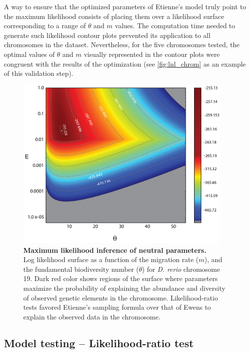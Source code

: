 A way to ensure that the optimized parameters of Etienne's model truly point to the maximum likelihood consists of placing them over a likelihood surface corresponding to a range of  $\theta$ and $m$ values. The computation time needed to generate such likelihood contour plots prevented its application to all chromosomes in the dataset. Nevertheless, for the five chromosomes tested, the optimal values of $\theta$ and $m$ visually represented in the contour plots were congruent with the results of the optimization (see \autoref{fig:lnl_chrom} as an example of this validation step).

\begin{figure}[!ht]
\centering 
\includegraphics[width=0.95\textwidth]{figures/material_methods/lnl_chrom.png}
\caption[Maximum likelihood inference of neutral parameters]{
  {\bf Maximum likelihood inference of neutral parameters.}\\
  Log likelihood surface as a function of the migration rate ($m$), and the fundamental biodiversity number ($\theta$) for \textit{D. rerio} chromosome 19. Dark red color shows regions of the surface where parameters maximize the probability of explaining the abundance and diversity of observed genetic elements in the chromosome. Likelihood-ratio tests favored Etienne's sampling formula over that of Ewens to explain the observed data in the chromosome.}
\label{fig:lnl_chrom}
\end{figure}

\subsection{Model testing -- Likelihood-ratio test}
\label{sec:model-test-likel}

